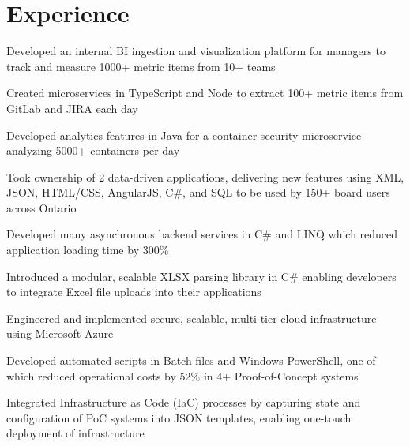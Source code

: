 \documentclass[]{deedy-resume-openfont}
\begin{document}
%
%



\section{Experience}

\begin{tightemize}
\item Developed an internal BI ingestion and visualization platform for managers to track and measure 1000+ metric items from 10+ teams
\item Created microservices in TypeScript and Node to extract 100+ metric items from GitLab and JIRA each day
\item Developed analytics features in Java for a container security microservice analyzing 5000+ containers per day
\end{tightemize}
\sectionsep

\begin{tightemize}
\item Took ownership of 2 data-driven applications, delivering new features using XML, JSON, HTML/CSS, AngularJS, C\#, and SQL to be used by 150+ board users across Ontario
\item Developed many asynchronous backend services in C\# and LINQ which reduced application loading time by 300\%
\item Introduced a modular, scalable XLSX parsing library in C\# enabling developers to integrate Excel file uploads into their applications
\end{tightemize}
\sectionsep

\begin{tightemize}
\item Engineered and implemented secure, scalable, multi-tier cloud infrastructure using Microsoft Azure
\item Developed automated scripts in Batch files and Windows PowerShell, one of which reduced operational costs by 52\% in 4+ Proof-of-Concept systems
\item Integrated Infrastructure as Code (IaC) processes by capturing state and configuration of PoC systems into JSON templates, enabling one-touch deployment of infrastructure
\end{tightemize}
\sectionsep
\end{document}

